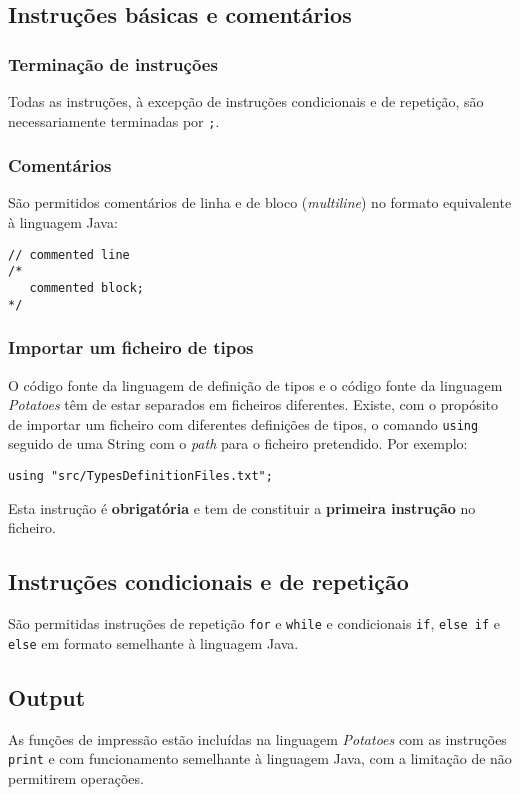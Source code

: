 \documentclass{report}
\begin{document}
\subsection{Instruções básicas e comentários}
\subsubsection{Terminação de instruções}
Todas as instruções, à excepção de instruções condicionais e de repetição, são necessariamente terminadas por \texttt{;}.

\subsubsection{Comentários}
São permitidos comentários de linha e de bloco (\textit{multiline}) no formato equivalente à linguagem Java:
\begin{lstlisting}[caption= Linguagem General-Purpose - Comentários]
// commented line
/*
   commented block;
*/
\end{lstlisting}

\subsubsection{Importar um ficheiro de tipos}
O código fonte da linguagem de definição de tipos e o código fonte da linguagem \textit{Potatoes} têm de estar separados em ficheiros diferentes. Existe, com o propósito de importar um ficheiro com diferentes definições de tipos, o comando \texttt{using} seguido de uma String com o \textit{path} para o ficheiro pretendido. Por exemplo:
\begin{lstlisting}[caption= Linguagem General-Purpose - Instrução \texttt{using}]
using "src/TypesDefinitionFiles.txt";
\end{lstlisting}
Esta instrução é \textbf{obrigatória} e tem de constituir a \textbf{primeira instrução} no ficheiro.

\subsection{Instruções condicionais e de repetição}
São permitidas instruções de repetição \texttt{for} e \texttt{while} e condicionais \texttt{if}, \texttt{else if} e \texttt{else} em formato semelhante à linguagem Java.

\subsection{Output}
As funções de impressão estão incluídas na linguagem \textit{Potatoes} com as instruções \texttt{print} e com funcionamento semelhante à linguagem Java, com a limitação de não permitirem operações. 
\end{document}
